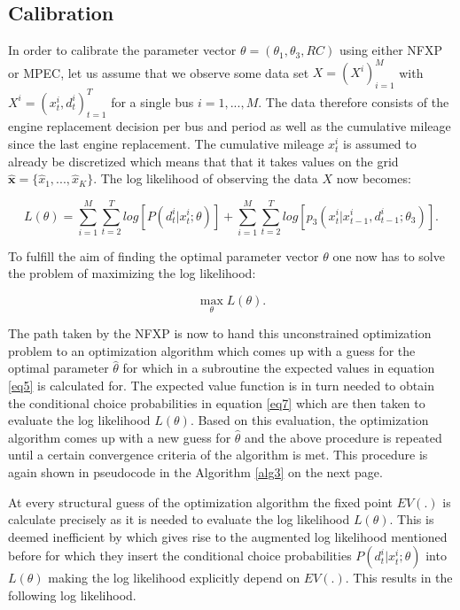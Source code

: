 \subsection{Calibration}

In order to calibrate the parameter vector $\theta =(\theta_1, \theta_3, RC)$ using either NFXP or MPEC, let us assume that we observe some data set $X = (X^i)^M_{i=1 }$ with $X^i = (x^i_t, d^i_t)^T_{t=1}$ for a single bus $i = 1, ..., M$. The data therefore consists of the engine replacement decision per bus and period as well as the cumulative mileage since the last engine replacement. The cumulative mileage $x^i_t$ is assumed to already be discretized which means that that it takes values on the grid $\mathbf{\hat x} = \{\hat x_1, ..., \hat x_K\}$. The log likelihood of observing the data $X$ now becomes:

\begin{equation}
	L(\theta) = \sum_{i=1}^{M} \sum_{t=2}^{T} log[P(d^i_t|x^i_t; \theta)] + \sum_{i=1}^{M} \sum_{t=2}^{T} log[p_3(x^i_t|x^i_{t-1}, d^i_{t-1}; \theta_3)].
\end{equation}

To fulfill the aim of finding the optimal parameter vector $\theta$ one now has to solve the problem of maximizing the log likelihood:

\begin{equation}
	\max_{\theta} L(\theta).
\end{equation}

The path taken by the NFXP is now to hand this unconstrained optimization problem to an optimization algorithm which comes up with a guess for the optimal parameter $\hat \theta$ for which in a subroutine the expected values in equation \ref{eq5} is calculated for. The expected value function is in turn needed to obtain the conditional choice probabilities in equation \ref{eq7} which are then taken to evaluate the log likelihood $L(\theta)$. Based on this evaluation, the optimization algorithm comes up with a new guess for $\hat \theta$ and the above procedure is repeated until a certain convergence criteria of the algorithm is met. This procedure is again shown in pseudocode in the Algorithm \ref{alg3} on the next page.

At every structural guess of the optimization algorithm the fixed point $EV(.)$ is calculate precisely as it is needed to evaluate the log likelihood $L(\theta)$. This is deemed inefficient by \citeauthor{Su.Judd.2012} which gives rise to the augmented log likelihood mentioned before for which they insert the conditional choice probabilities $P(d^i_t|x^i_t; \theta)$ into $L(\theta)$ making the log likelihood explicitly depend on $EV(.)$. This results in the following log likelihood.

